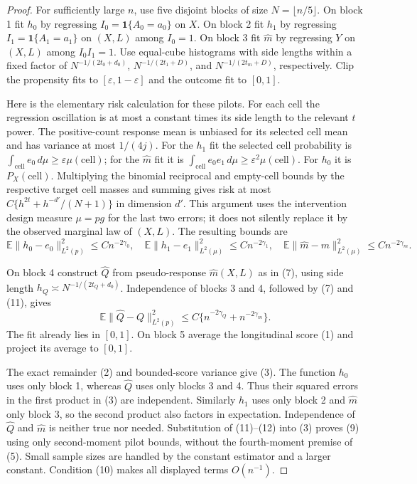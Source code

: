 \documentclass[11pt]{article}
\theoremstyle{definition}
\begin{document}
\begin{proof}
For sufficiently large $n$, use five disjoint blocks of size
$N=\lfloor n/5\rfloor$. On block 1 fit $h_0$ by regressing
$I_0=\mathbf1\{A_0=a_0\}$ on $X$. On block 2 fit $h_1$ by regressing
$I_1=\mathbf1\{A_1=a_1\}$ on $(X,L)$ among $I_0=1$. On block 3 fit
$\widehat m$ by regressing $Y$ on $(X,L)$ among $I_0I_1=1$.
Use equal-cube histograms with side lengths within a fixed factor of
$N^{-1/(2t_0+d_0)}$, $N^{-1/(2t_1+D)}$, and
$N^{-1/(2t_m+D)}$, respectively. Clip the propensity fits to
$[\varepsilon,1-\varepsilon]$ and the outcome fit to $[0,1]$.

Here is the elementary risk calculation for these pilots. For each cell
the regression oscillation is at most a constant times its side length
to the relevant $t$ power. The positive-count response mean is unbiased
for its selected cell mean and has variance at most $1/(4j)$.
For the $h_1$ fit the selected cell probability is
$\int_{\text{cell}}e_0\,d\mu\ge\varepsilon\mu(\text{cell})$;
for the $\widehat m$ fit it is
$\int_{\text{cell}}e_0e_1\,d\mu\ge\varepsilon^2\mu(\text{cell})$.
For $h_0$ it is $P_X(\text{cell})$. Multiplying the binomial reciprocal
and empty-cell bounds by the respective target cell masses and summing
gives risk at most $C\{h^{2t}+h^{-d'}/(N+1)\}$ in dimension $d'$.
This argument uses the intervention design measure $\mu=p g$ for the
last two errors; it does not silently replace it by the observed marginal
law of $(X,L)$. The resulting bounds are
\[
 \mathbb E\|h_0-e_0\|_{L^2(p)}^2\le Cn^{-2\gamma_0},\quad
 \mathbb E\|h_1-e_1\|_{L^2(\mu)}^2\le Cn^{-2\gamma_1},\quad
 \mathbb E\|\widehat m-m\|_{L^2(\mu)}^2\le Cn^{-2\gamma_m}.
                                                               \tag{11}
\]

On block 4 construct $\widehat Q$ from pseudo-response
$\widehat m(X,L)$ as in (7), using side length
$h_Q\asymp N^{-1/(2t_Q+d_0)}$. Independence of blocks 3 and 4,
followed by (7) and (11), gives
\[
 \mathbb E\|\widehat Q-Q\|_{L^2(p)}^2
 \le C\{n^{-2\gamma_Q}+n^{-2\gamma_m}\}.                        \tag{12}
\]
The fit already lies in $[0,1]$. On block 5 average the longitudinal
score (1) and project its average to $[0,1]$.

The exact remainder (2) and bounded-score variance give (3).
The function $h_0$ uses only block 1, whereas $\widehat Q$ uses only
blocks 3 and 4. Thus their squared errors in the first product in (3)
are independent. Similarly $h_1$ uses only block 2 and $\widehat m$
only block 3, so the second product also factors in expectation.
Independence of $\widehat Q$ and $\widehat m$ is neither true nor
needed. Substitution of (11)--(12) into (3) proves (9) using only
second-moment pilot bounds, without the fourth-moment premise of (5).
Small sample sizes are handled by the constant estimator and a larger
constant. Condition (10) makes all displayed terms $O(n^{-1})$.


\end{proof}
\end{document}
